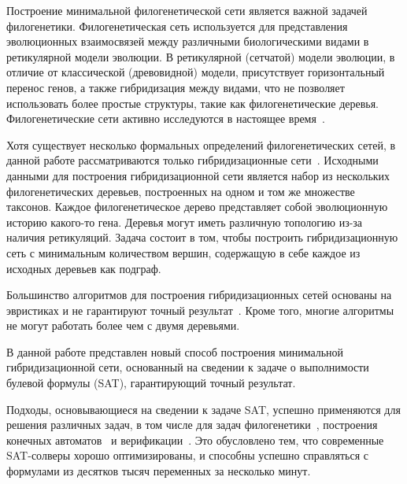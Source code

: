 \startprefacepage

Построение минимальной филогенетической сети является важной задачей филогенетики.
Филогенетическая сеть используется для представления эволюционных взаимосвязей между различными биологическими видами в ретикулярной модели эволюции.
В ретикулярной (сетчатой) модели эволюции, в отличие от классической (древовидной) модели, присутствует горизонтальный перенос генов, а также гибридизация между видами, что не позволяет использовать более простые структуры, такие как филогенетические деревья.
Филогенетические сети активно исследуются в настоящее время~\cite{huson2010phylogenetic, morrison2011introduction, 
nakhleh2011evolutionary}.

Хотя существует несколько формальных определений филогенетических сетей, в данной работе рассматриваются только гибридизационные сети~\cite{semple2006hybridization, chen2010hybridnet}.
Исходными данными для построения гибридизационной сети является набор из нескольких филогенетических деревьев, построенных на одном и том же множестве таксонов.
Каждое филогенетическое дерево представляет собой эволюционную историю какого-то гена.
Деревья могут иметь различную топологию из-за наличия ретикуляций.
Задача состоит в том, чтобы построить гибридизационную сеть с минимальным количеством вершин, содержащую в себе каждое из исходных деревьев как подграф.

Большинство алгоритмов для построения гибридизационных сетей основаны на эвристиках и не гарантируют точный результат~\cite{wu2010close, park2012murpar}.
Кроме того, многие алгоритмы не могут работать более чем с двумя деревьями.

В данной работе представлен новый способ построения минимальной гибридизационной сети, основанный на сведении к задаче о выполнимости булевой формулы (SAT), гарантирующий точный результат.

Подходы, основывающиеся на сведении к задаче SAT, успешно применяются для решения различных задач, в том числе для задач филогенетики~\cite{bonet2009efficiently}, построения конечных автоматов~\cite{heule2010exact} и верификации~\cite{biere2003bounded}.
Это обусловлено тем, что современные SAT-солверы хорошо оптимизированы, и способны успешно справляться с формулами из десятков тысяч переменных за несколько минут.
